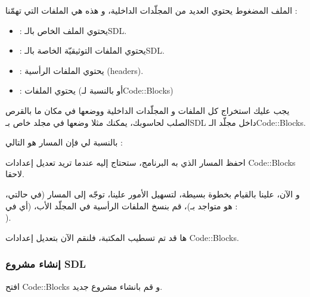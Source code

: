 الملف المضغوط يحتوي العديد من المجلّدات الداخلية، و هذه هي الملفات التي تهمّنا :

\begin{itemize}
	\item {} :
	يحتوي الملف 
	الخاص بالـ\textenglish{SDL}.
	\item {} :
	يحتوي الملفات التوثيقيّة الخاصة بالـ\textenglish{SDL}.
	\item {} :
	يحتوي الملفات الرأسية
	(\textenglish{headers}).
	\item {} :
	يحتوي الملفات 
	(أو
	بالنسبة لـ\textenglish{Code::Blocks})
\end{itemize}

يجب عليك استخراج كل الملفات و المجلّدات الداخلية ووضعها في مكان ما بالقرص الصلب لحاسوبك، يمكنك مثلا وضعها في مجلد خاص بـ\textenglish{SDL}
داخل مجلّد الـ\textenglish{Code::Blocks}.


بالنسبة لي فإن المسار هو التالي :


احفظ المسار الذي به البرنامج، ستحتاج إليه عندما تريد تعديل إعدادات 
\textenglish{Code::Blocks}
لاحقا.

و الآن، علينا بالقيام بخطوة بسيطة، لتسهيل الأمور علينا، توجّه إلى المسار
(في حالتي، هو متواجد بـ)،
قم بنسخ الملفات الرأسية
 في المجلّد الأب، (أي في :\\ 
).


ها قد تم تسطيب المكتبة، فلنقم الآن بتعديل إعدادات
\textenglish{Code::Blocks}.

\subsubsection{إنشاء مشروع \textenglish{SDL}}

افتح
\textenglish{Code::Blocks}
و قم بانشاء مشروع جديد.


